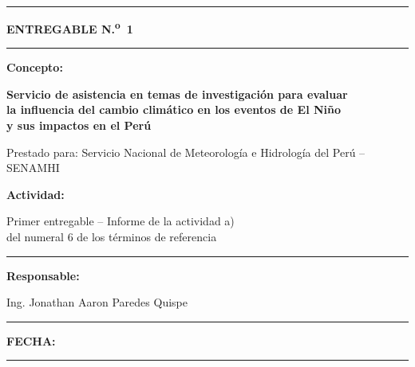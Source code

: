 \documentclass[11pt,a4paper]{article}
\begin{document}
\begin{titlepage}
\centering
\noindent\rule{\textwidth}{0.6pt}

\vspace{1.2cm}
{\Large \bfseries ENTREGABLE N.\textsuperscript{o}~1 \par}
\vspace{1.2cm}
\rule{0.7\textwidth}{0.6pt}

\vspace{1.2cm}
{\normalsize \bfseries Concepto: \par}
\vspace{0.3cm}
{\large \bfseries Servicio de asistencia en temas de investigación para evaluar\\
la influencia del cambio climático en los eventos de El Niño\\
y sus impactos en el Perú \par}

\vspace{1.4cm}
{\small Prestado para: Servicio Nacional de Meteorología e Hidrología del Perú -- SENAMHI \par}

\vspace{1.4cm}
{\normalsize \bfseries Actividad: \par}
\vspace{0.2cm}
{\normalsize Primer entregable -- Informe de la actividad a)\\
del numeral 6 de los términos de referencia \par}

\vspace{1.2cm}
\rule{0.7\textwidth}{0.6pt}

\vspace{0.3cm}
{\small \bfseries Responsable: \par}
\vspace{0.2cm}
{\small Ing. Jonathan Aaron Paredes Quispe \par}
\vspace{0.3cm}
\rule{0.7\textwidth}{0.6pt}

\vfill
{\small \bfseries FECHA: \fechaentrega \par}
\vspace{0.6cm}
\noindent\rule{\textwidth}{0.6pt}
\end{titlepage}

\tableofcontents
\clearpage
\listoffigures
\listoftables
\clearpage
{}








\clearpage


\clearpage


\end{document}
